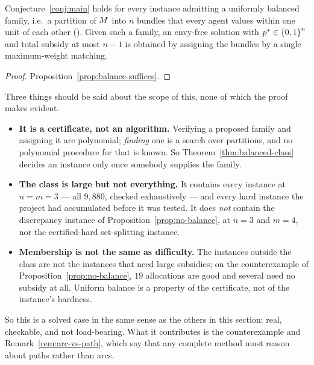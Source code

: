 \begin{theorem}
\label{thm:balanced-class}
Conjecture~\ref{conj:main} holds for every instance admitting a uniformly
balanced family, i.e.\ a partition of $M$ into $n$ bundles that every agent
values within one unit of each other
(). Given such a family, an envy-free solution with
$p^{*} \in \left\{0,1\right\}^n$ and total subsidy at most $n-1$ is obtained by
assigning the bundles by a single maximum-weight matching.
\end{theorem}

\begin{proof}
Proposition~\ref{prop:balance-suffices}.
\end{proof}

Three things should be said about the scope of this, none of which the proof
makes evident.

\begin{itemize}
  \item \textbf{It is a certificate, not an algorithm.} Verifying a proposed
    family and assigning it are polynomial; \emph{finding} one is a search over
    partitions, and no polynomial procedure for that is known. So
    Theorem~\ref{thm:balanced-class} decides an instance only once somebody
    supplies the family.
  \item \textbf{The class is large but not everything.} It contains every
    instance at $n = m = 3$ --- all $9{,}880$, checked exhaustively --- and every
    hard instance the project had accumulated before it was tested. It does
    \emph{not} contain the discrepancy instance of
    Proposition~\ref{prop:no-balance}, at $n = 3$ and $m = 4$, nor the
    certified-hard set-splitting instance.
  \item \textbf{Membership is not the same as difficulty.} The instances outside
    the class are not the instances that need large subsidies; on the
    counterexample of Proposition~\ref{prop:no-balance}, $19$ allocations are
    good and several need no subsidy at all. Uniform balance is a property of
    the certificate, not of the instance's hardness.
\end{itemize}

So this is a solved case in the same sense as the others in this section: real,
checkable, and not load-bearing. What it contributes is the counterexample and
Remark~\ref{rem:arc-vs-path}, which say that any complete method must reason
about paths rather than arcs.

